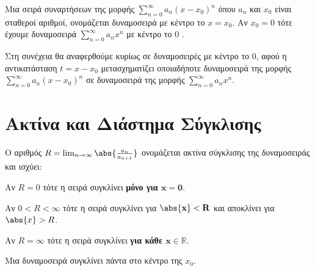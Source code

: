 



\pagestyle{vangelis}




\begin{center}
  \minibox{\large\bfseries \textcolor{Col1}{Δυναμοσειρές}}
\end{center}

\vspace{\baselineskip}

\begin{dfn}
  Μια σειρά συναρτήσεων της μορφής $ \sum_{n=0}^{\infty} a_{n}(x- x_{0})^{n} $ 
  όπου $ a_{n} $ και $ x_{0} $ είναι σταθεροί αριθμοί, ονομάζεται 
  \textcolor{Col1}{δυναμοσειρά} με κέντρο το $ x= x_{0} $. 
  Αν $ x_{0}=0 $ τότε έχουμε δυναμοσειρά 
  $ \sum_{n=0}^{\infty} a_{n} x^{n} $ με κέντρο το 0 .
\end{dfn}

\begin{rem}
  Στη συνέχεια θα αναφερθούμε κυρίως σε δυναμοσειρές με κέντρο το 0, αφού η 
  αντικατάσταση $ t=x- x_{0} $ μετασχηματίζει οποιαδήποτε δυναμοσειρά της μορφής 
  $ \sum_{n=0}^{\infty} a_{n}(x- x_{0})^{n} $ σε δυναμοσειρά της μορφής $
  \sum_{n=0}^{\infty} a_{n} x^{n} $. 
\end{rem}

\section*{Ακτίνα και Διάστημα Σύγκλισης}

\begin{dfn}
  Ο αριθμός $ R = \lim_{n \to \infty} \abs{\frac{a_{n}}{a_{n+1}}} $ ονομάζεται 
  \textcolor{Col1}{ακτίνα σύγκλισης} της δυναμοσειράς και ισχύει:
  \begin{myitemize}
    \item Αν $ R=0 $ τότε η σειρά συγκλίνει \textbf{μόνο για $ \mathbf{x=0} $}.
    \item Αν $0 < R < \infty $ τότε η σειρά συγκλίνει για $ \mathbf{\abs{x} < R} $ και 
      αποκλίνει για $ \abs{x} > R $.
    \item Αν $ R= \infty $ τότε η σειρά συγκλίνει \textbf{για κάθε $ \mathbf{x \in
      \mathbb{R}} $}.
  \end{myitemize}
\end{dfn}

\begin{rem}
  Μια δυναμοσειρά συγκλίνει πάντα στο κέντρο της $ x_{0} $.
\end{rem}

